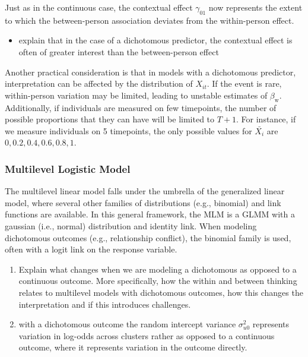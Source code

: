 \documentclass[stu]{apa7}
\begin{document}
Just as in the continuous case, the contextual effect \( \gamma_{01} \) now represents the extent to which the between-person association deviates from the within-person effect.

\begin{itemize}
    \item explain that in the case of a dichotomous predictor, the contextual effect is often of greater interest than the between-person effect
\end{itemize}

Another practical consideration is that in models with a dichotomous predictor, interpretation can be affected by the distribution of \( X_{it} \). If the event is rare, within-person variation may be limited, leading to unstable estimates of \( \beta_\text{w} \). Additionally, if individuals are measured on few timepoints, the number of possible proportions that they can have will be limited to $T+1$. For instance, if we measure individuals on 5 timepoints, the only possible values for \( \bar{X_i} \) are $0, 0.2, 0.4, 0.6, 0.8, 1$.

\subsubsection{Multilevel Logistic Model}

The multilevel linear model falls under the umbrella of the generalized linear model, where several other families of distributions (e.g., binomial) and link functions are available. In this general framework, the MLM is a GLMM with a gaussian (i.e., normal) distribution and identity link. When modeling dichotomous outcomes (e.g., relationship conflict), the binomial family is used, often with a logit link  on the response variable. 

\begin{enumerate}
    \item Explain what changes when we are modeling a dichotomous as opposed to a continuous outcome. More specifically, how the within and between thinking relates to multilevel models with dichotomous outcomes, how this changes the interpretation and if this introduces challenges.
    \item with a dichotomous outcome the random intercept variance $\sigma^2_{u0}$ represents variation in log-odds across clusters rather as opposed to a continuous outcome, where it represents variation in the outcome directly.
\end{enumerate}
\end{document}
